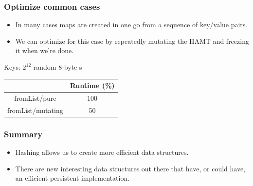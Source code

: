 \documentclass[xetex,mathserif,serif]{beamer}
\newcommand{\code}[1]{\mbox{\texttt{\small{\color{CodeColor}{#1}}}}}
\begin{document}
\begin{frame}
  \frametitle{Optimize common cases}
  \begin{itemize}
  \item In many cases maps are created in one go from a sequence of
    key/value pairs.
  \item We can optimize for this case by repeatedly mutating the HAMT
    and freezing it when we're done.
  \end{itemize}

  \bigskip
  Keys: $2^{12}$ random 8-byte \code{ByteString}s

  \bigskip
  \begin{center}
  \begin{tabular}{c|c}
                         & Runtime (\%) \\
    \hline fromList/pure & 100 \\
           fromList/mutating & 50 \\
  \end{tabular}
  \end{center}
\end{frame}

\begin{frame}
  \frametitle{Summary}
  \begin{itemize}
  \item Hashing allows us to create more efficient data structures.
  \item There are new interesting data structures out there that have,
    or could have, an efficient persistent implementation.
  \end{itemize}
\end{frame}
\end{document}
